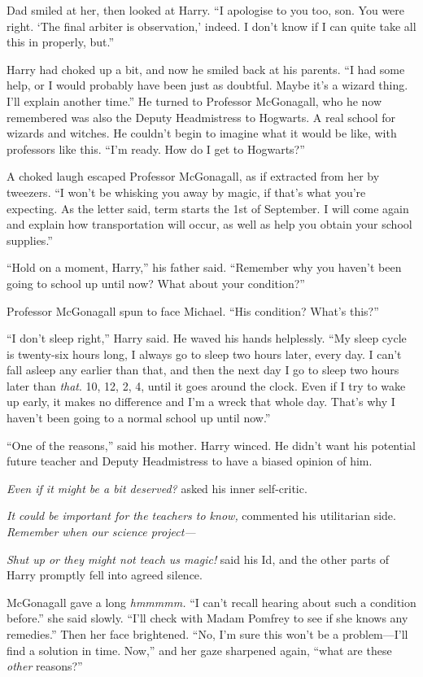 Dad smiled at her, then looked at Harry. “I apologise to
you too, son. You were right. ‘The final arbiter is
observation,’ indeed. I don’t know if I can quite take all
this in properly, but.”

Harry had choked up a bit, and now he smiled back at his
parents. “I had some help, or I would probably have been
just as doubtful. Maybe it’s a wizard thing. I’ll explain
another time.” He turned to Professor McGonagall, who he
now remembered was also the Deputy Headmistress to
Hogwarts. A real school for wizards and witches. He
couldn’t begin to imagine what it would be like, with
professors like this. “I’m ready. How do I get to Hogwarts?”

A choked laugh escaped Professor McGonagall, as if extracted from her by
tweezers. “I won’t be whisking you away by
magic, if that’s what you’re expecting. As the letter said,
term starts the 1st of September. I will come again and explain
how transportation will occur, as well as help you obtain
your school supplies.”

“Hold on a moment, Harry,” his father said. “Remember why you haven’t been
going to school up until now? What about your condition?”

Professor McGonagall spun to face Michael. “His condition? What’s this?”

“I don’t sleep right,” Harry said. He waved his hands helplessly. “My sleep
cycle is twenty-six hours long, I always go to sleep two hours later, every
day. I can’t fall asleep any earlier than that, and then the next day I go to
sleep two hours later than \emph{that}. 10\pm, 12\am, 2\am, 4\am, until it goes
around the clock. Even if I try to wake up early, it makes no difference and
I’m a wreck that whole day. That’s why I haven’t been going to a normal school
up until now.”

“One of the reasons,” said his mother. Harry winced. He
didn’t want his potential future teacher and Deputy
Headmistress to have a biased opinion of him.

\emph{Even if it might be a bit deserved?} asked his inner self-critic.

\emph{It could be important for the teachers to know,}
commented his utilitarian side. \emph{Remember when our science project—}

\emph{Shut up or they might not teach us magic!} said his Id,
and the other parts of Harry promptly fell into agreed silence.

McGonagall gave a long \emph{hmmmmm.} “I can’t recall hearing about such a
condition before.” she said slowly. “I’ll check with Madam Pomfrey to
see if she knows any remedies.” Then her face brightened. “No, I’m sure this
won’t be a problem—I’ll find a solution in time. Now,” and her gaze sharpened
again, “what are these \emph{other} reasons?”

